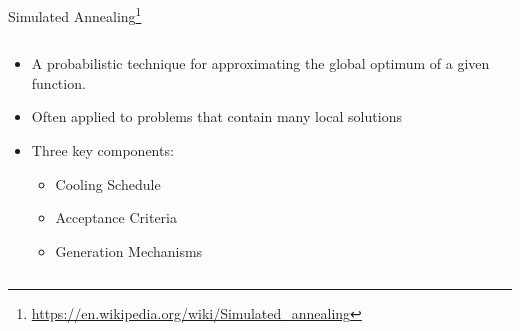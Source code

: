 \documentclass[aspectratio=169,dvipsnames]{beamer}
\begin{document}
\begin{frame}[label={sec:orgbc55923}]{Simulated Annealing\footnote{\url{https://en.wikipedia.org/wiki/Simulated\_annealing}}}
\begin{columns}
\begin{column}{0.5\columnwidth}
\begin{itemize}
\item A probabilistic technique for approximating the global optimum of a given function.
\item Often applied to problems that contain many local solutions
\item Three key components:
\begin{itemize}
\item Cooling Schedule
\item Acceptance Criteria
\item Generation Mechanisms
\end{itemize}
\end{itemize}
\end{column}

\begin{column}{0.5\columnwidth}
\centering
{}
\end{column}
\end{columns}
\end{frame}
\end{document}
